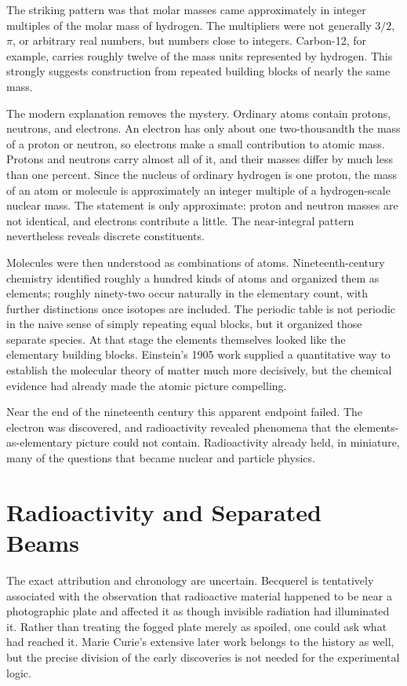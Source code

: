 The striking pattern was that molar masses came approximately in integer multiples of the molar mass of hydrogen. The multipliers were not generally \(3/2\), \(\pi\), or arbitrary real numbers, but numbers close to integers. Carbon-12, for example, carries roughly twelve of the mass units represented by hydrogen. This strongly suggests construction from repeated building blocks of nearly the same mass.

The modern explanation removes the mystery. Ordinary atoms contain protons, neutrons, and electrons. An electron has only about one two-thousandth the mass of a proton or neutron, so electrons make a small contribution to atomic mass. Protons and neutrons carry almost all of it, and their masses differ by much less than one percent. Since the nucleus of ordinary hydrogen is one proton, the mass of an atom or molecule is approximately an integer multiple of a hydrogen-scale nuclear mass. The statement is only approximate: proton and neutron masses are not identical, and electrons contribute a little. The near-integral pattern nevertheless reveals discrete constituents.

Molecules were then understood as combinations of atoms. Nineteenth-century chemistry identified roughly a hundred kinds of atoms and organized them as elements; roughly ninety-two occur naturally in the elementary count, with further distinctions once isotopes are included. The periodic table is not periodic in the naive sense of simply repeating equal blocks, but it organized those separate species. At that stage the elements themselves looked like the elementary building blocks. Einstein's 1905 work supplied a quantitative way to establish the molecular theory of matter much more decisively, but the chemical evidence had already made the atomic picture compelling.

Near the end of the nineteenth century this apparent endpoint failed. The electron was discovered, and radioactivity revealed phenomena that the elements-as-elementary picture could not contain. Radioactivity already held, in miniature, many of the questions that became nuclear and particle physics.

\section{Radioactivity and Separated Beams}

The exact attribution and chronology are uncertain. Becquerel is tentatively associated with the observation that radioactive material happened to be near a photographic plate and affected it as though invisible radiation had illuminated it. Rather than treating the fogged plate merely as spoiled, one could ask what had reached it. Marie Curie's extensive later work belongs to the history as well, but the precise division of the early discoveries is not needed for the experimental logic.

